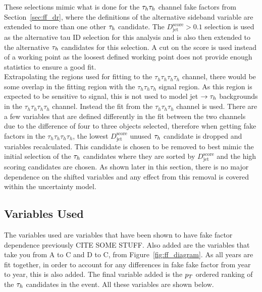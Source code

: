 These selections mimic what is done for the $\tau_{h}\tau_{h}$ channel fake factors from Section~\ref{sec:ff_dr}, where the definitions of the alternative sideband variable are extended to more than one other $\tau_{h}$ candidate.
The $D_{\text{jet}}^{\text{score}} > 0.1$ selection is used as the alternative tau ID selection for this analysis and is also then extended to the alternative $\tau_{h}$ candidates for this selection.
A cut on the score is used instead of a working point as the loosest defined working point does not provide enough statistics to ensure a good fit. \\

Extrapolating the regions used for fitting to the $\tau_h \tau_h \tau_h \tau_h$ channel, there would be some overlap in the fitting region with the $\tau_h \tau_h \tau_h$ signal region. 
As this region is expected to be sensitive to signal, this is not used to model jet $\rightarrow\tau_{h}$ backgrounds in the $\tau_h \tau_h \tau_h \tau_h$ channel. 
Instead the fit from the $\tau_h \tau_h \tau_h$ channel is used. 
There are a few variables that are defined differently in the fit between the two channels due to the difference of four to three objects selected, therefore when getting fake factors in the $\tau_h \tau_h \tau_h \tau_h$, the lowest $D_{\text{jet}}^{\text{score}}$ unused $\tau_{h}$ candidate is dropped and variables recalculated. 
This candidate is chosen to be removed to best mimic the initial selection of the $\tau_{h}$ candidates where they are sorted by $D_{\text{jet}}^{\text{score}}$ and the high scoring candidates are chosen. 
As shown later in this section, there is no major dependence on the shifted variables and any effect from this removal is covered within the uncertainty model. \\

\subsection{Variables Used}

The variables used are variables that have been shown to have fake factor dependence previously CITE SOME STUFF. 
Also added are the variables that take you from A to C and D to C, from Figure~\ref{fig:ff_diagram}. 
As all years are fit together, in order to account for any differences in fake fake factor from year to year, this is also added. 
The final variable added is the $p_{T}$ ordered ranking of the $\tau_{h}$ candidates in the event.
All these variables are shown below.

